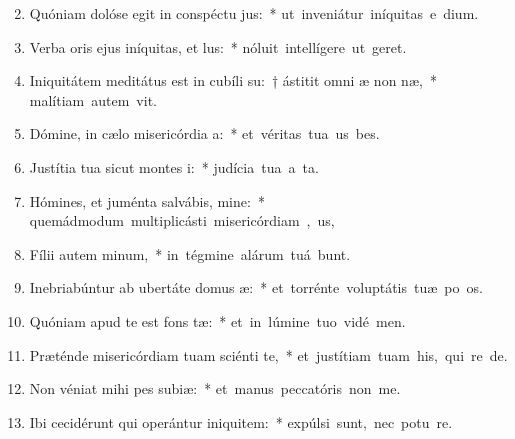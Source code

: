 \begin{flushleft}
\begin{enumerate}[leftmargin=*]
\setcounter{enumi}{1}


\item Quóniam dolóse egit in conspéctu jus:~* \mbox{ut inveniátur iníquitas e  dium.}
\item Verba oris ejus iníquitas, et lus:~* \mbox{nóluit intellígere ut  geret.}
\item Iniquitátem meditátus est in cubíli su:~† ástitit omni æ non næ,~* \mbox{malítiam autem  vit.}
\item Dómine, in cælo misericórdia a:~* \mbox{et véritas tua us  bes.}
\item Justítia tua sicut montes i:~* \mbox{judícia tua a ta.}
\item Hómines, et juménta salvábis, mine:~* \mbox{quemádmodum multiplicásti misericórdiam , us,}
\item Fílii autem minum,~* \mbox{in tégmine alárum tuá bunt.}
\item Inebriabúntur ab ubertáte domus æ:~* \mbox{et torrénte voluptátis tuæ po os.}
\item Quóniam apud te est fons tæ:~* \mbox{et in lúmine tuo vidé men.}
\item Præténde misericórdiam tuam sciénti te,~* \mbox{et justítiam tuam his, qui re  de.}
\item Non véniat mihi pes subiæ:~* \mbox{et manus peccatóris non  me.}
\item Ibi cecidérunt qui operántur iniquitem:~* \mbox{expúlsi sunt, nec potu re.}



\end{enumerate}
\end{flushleft}

